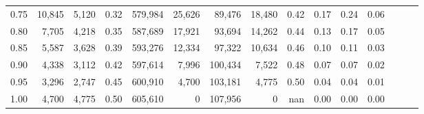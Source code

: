 \begin{tabular}{rrrrrrrrrrrrrrr}
0.75 &  10,845 &   5,120 &  0.32 &  579,984 &   25,626 &   89,476 &   18,480 &  0.42 &  0.17 &  0.24 &      0.06 \\
0.80 &   7,705 &   4,218 &  0.35 &  587,689 &   17,921 &   93,694 &   14,262 &  0.44 &  0.13 &  0.17 &      0.05 \\
0.85 &   5,587 &   3,628 &  0.39 &  593,276 &   12,334 &   97,322 &   10,634 &  0.46 &  0.10 &  0.11 &      0.03 \\
0.90 &   4,338 &   3,112 &  0.42 &  597,614 &    7,996 &  100,434 &    7,522 &  0.48 &  0.07 &  0.07 &      0.02 \\
0.95 &   3,296 &   2,747 &  0.45 &  600,910 &    4,700 &  103,181 &    4,775 &  0.50 &  0.04 &  0.04 &      0.01 \\
1.00 &   4,700 &   4,775 &  0.50 &  605,610 &        0 &  107,956 &        0 &   nan &  0.00 &  0.00 &      0.00 \\
\bottomrule
\end{tabular}
